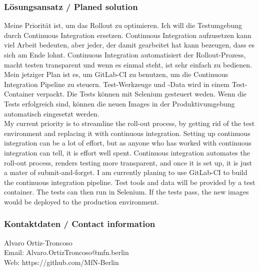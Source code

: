 \documentclass[12pt]{beamer}
\begin{document}
{\scriptsize
\begin{frame}
  \frametitle{Lösungsansatz / \textcolor{mfn_green}{Planed solution}}
  Meine Priorität ist, um das Rollout zu optimieren. Ich will die Testumgebung durch Continuous Integration ersetzen. Continuous Integration aufzusetzen kann viel Arbeit bedeuten, aber jeder, der damit gearbeitet hat kann bezeugen, dass es sich am Ende lohnt. Continuous Integration automatisiert der Rollout-Prozess, macht testen transparent und wenn es einmal steht, ist sehr einfach zu bedienen. Mein jetziger Plan ist es, um GitLab-CI zu benutzen, um die Continuous Integration Pipeline zu steuern. Test-Werkzeuge und -Data wird in einem Test-Container verpackt. Die Tests können mit Selenium gesteuert weden. Wenn die Tests erfolgreich sind, können die neuen Images in der Produktivumgebung automatisch eingesetzt werden.\\
  \bigskip
  \textcolor{mfn_green}{My current priority is to streamline the roll-out process, by getting rid of the test environment and replacing it with continuous integration. Setting up continuous integration can be a lot of effort, but as anyone who has worked with continuous integration can tell, it is effort well spent. Continuous integration automates the roll-out process, renders testing more transparent, and once it is set up, it is just a mater of submit-and-forget. I am currently planing to use GitLab-CI to build the continuous integration pipeline. Test tools and data will be provided by a test container. The tests can then run in Selenium. If the tests pass, the new images would be deployed to the production environment.}
\end{frame}
}
\begin{frame}
  \frametitle{Kontaktdaten / \textcolor{mfn_green}{Contact information}}
  \begin{center}
    Alvaro Ortiz-Troncoso \\
    \medskip
    Email: Alvaro.OrtizTroncoso@mfn.berlin \\    
    \medskip
    Web: https://github.com/MfN-Berlin
  \end{center}
\end{frame}
\end{document}
